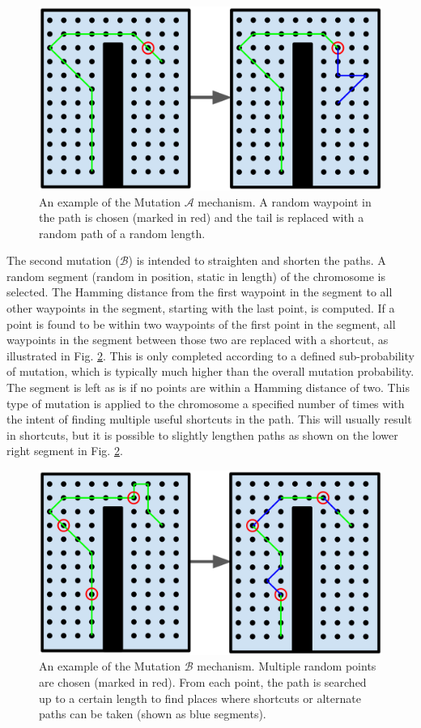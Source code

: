 \documentclass[letterpaper, 10 pt, conference]{ieeeconf}  %
\begin{document}
\begin{figure}
\centering
\includegraphics[width=1.0\linewidth]{figures/mutation.png}
\caption{An example of the Mutation $\mathcal{A}$ mechanism. A random waypoint in the path is chosen (marked in red) and the tail is replaced with a random path of a random length.}
\label{fig:mutation}
\end{figure}

The second mutation ($\mathcal{B}$) is intended to straighten and shorten the paths. A random segment (random in position, static in length) of the chromosome is selected. The Hamming distance from the first waypoint in the segment to all other waypoints in the segment, starting with the last point, is computed. If a point is found to be within two waypoints of the first point in the segment, all waypoints in the segment between those two are replaced with a shortcut, as illustrated in Fig. \ref{fig:muterpolation}. This is only completed according to a defined sub-probability of mutation, which is typically much higher than the overall mutation probability. The segment is left as is if no points are within a Hamming distance of two. This type of mutation is applied to the chromosome a specified number of times with the intent of finding multiple useful shortcuts in the path. This will usually result in shortcuts, but it is possible to slightly lengthen paths as shown on the lower right segment in Fig. \ref{fig:muterpolation}.

\begin{figure}
\centering
\includegraphics[width=1.0\linewidth]{figures/muterpolation.png}
\caption{An example of the Mutation $\mathcal{B}$ mechanism. Multiple random points are chosen (marked in red). From each point, the path is searched up to a certain length to find places where shortcuts or alternate paths can be taken (shown as blue segments).}
\label{fig:muterpolation}
\end{figure}
\end{document}
